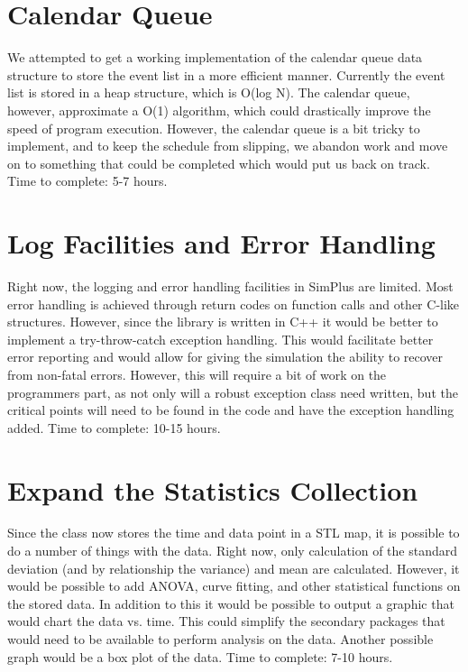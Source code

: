 \documentclass[12pt]{report}
\begin{document}
\section{Calendar Queue}
	We attempted to get a working implementation of the calendar queue data structure to store the event list in a more efficient manner.  Currently the event list is stored in a heap structure, which is O(log N).  The calendar queue, however, approximate a O(1) algorithm, which could drastically improve the speed of program execution.  However, the calendar queue is a bit tricky to implement, and to keep the schedule from slipping, we abandon work and move on to something that could be completed which would put us back on track.  Time to complete: 5-7 hours.

\section{Log Facilities and Error Handling}
	Right now, the logging and error handling facilities in SimPlus are limited.  Most error handling is achieved through return codes on function calls and other C-like structures.  However, since the library is written in C++ it would be better to implement a try-throw-catch exception handling.  This would facilitate better error reporting and would allow for giving the simulation the ability to recover from non-fatal errors.  However, this will require a bit of work on the programmers part, as not only will a robust exception class need written, but the critical points will need to be found in the code and have the exception handling added.  Time to complete: 10-15 hours.

\section{Expand the Statistics Collection}
	Since the class now stores the time and data point in a STL map, it is possible to do a number of things with the data.  Right now, only calculation of the standard deviation (and by relationship the variance) and mean are calculated.  However, it would be possible to add ANOVA, curve fitting, and other statistical functions on the stored data.  In addition to this it would be possible to output a graphic that would chart the data vs. time.  This could simplify the secondary packages that would need to be available to perform analysis on the data.  Another possible graph would be a box plot of the data.  Time to complete: 7-10 hours.
\end{document}

